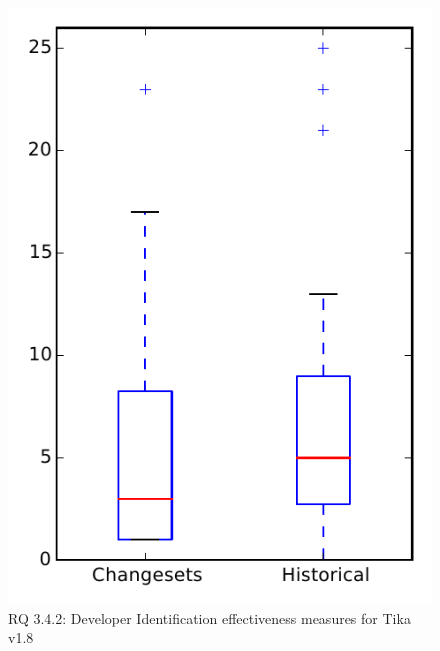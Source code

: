 
\begin{figure}
\centering
\includegraphics[height=0.4\textheight]{figures/dit/rq2_tika}
\caption{RQ 3.4.2: Developer Identification effectiveness measures for Tika v1.8}
\label{fig:dit:rq2:tika}
\end{figure}
